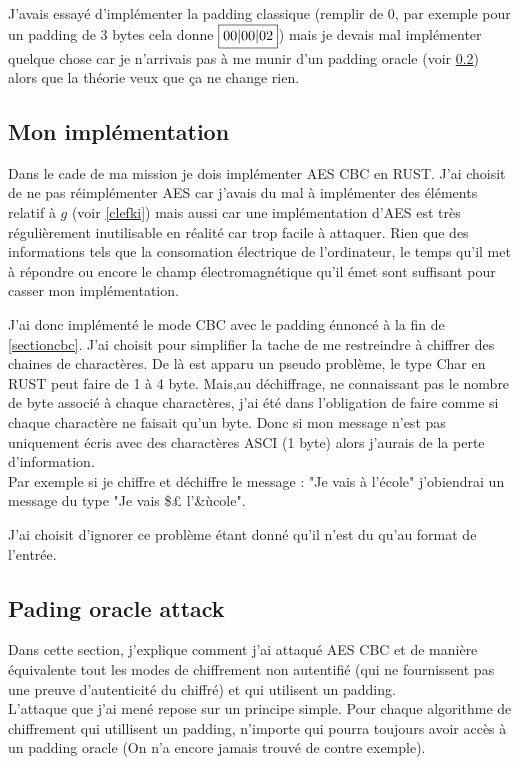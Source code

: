 \documentclass[a4paper, 12pt]{article}
\begin{document}
J'avais essayé d'implémenter la padding classique (remplir de $0$, par exemple pour un padding de 3 bytes cela donne $\fbox{00|00|02}$) mais je devais mal implémenter quelque chose car je n'arrivais pas à me munir d'un padding oracle (voir \ref{padoracle}) alors que la théorie veux que ça ne change rien.

\subsection{Mon implémentation}
Dans le cade de ma mission je dois implémenter AES CBC en RUST. 
J'ai choisit de ne pas réimplémenter AES car j'avais du mal à implémenter des éléments relatif à $g$ (voir \ref{clefki}) mais aussi car une implémentation d'AES est très régulièrement inutilisable en réalité car trop facile à attaquer. Rien que des informations tels que la consomation électrique de l'ordinateur, le temps qu'il met à répondre ou encore le champ électromagnétique qu'il émet sont suffisant pour casser mon implémentation. 

J'ai donc implémenté le mode CBC avec le padding énnoncé à la fin de \ref{sectioncbc}. J'ai choisit pour simplifier la tache de me restreindre à chiffrer des chaines de charactères. De là est apparu un pseudo problème, le type Char en RUST peut faire de 1 à 4 byte. Mais,au déchiffrage, ne connaissant pas le nombre de byte associé à chaque charactères, j'ai été dans l'obligation de faire comme si chaque charactère ne faisait qu'un byte. Donc si mon message n'est pas uniquement écris avec des charactères ASCI (1 byte) alors j'aurais de la perte d'information. \\
Par exemple si je chiffre et déchiffre le message : "Je vais à l'école" j'obiendrai un message du type "Je vais \$£ l'\&ùcole".

J'ai choisit d'ignorer ce problème étant donné qu'il n'est du qu'au format de l'entrée.

\subsection{Pading oracle attack}\label{padoracle}
Dans cette section, j'explique comment j'ai attaqué AES CBC et de manière équivalente tout les modes de chiffrement non autentifié (qui ne fournissent pas une preuve d'autenticité du chiffré) et qui utilisent un padding. \\ 

L'attaque que j'ai mené repose sur un principe simple. Pour chaque algorithme de chiffrement qui utillisent un padding, n'importe qui pourra toujours avoir accès à un padding oracle (On n'a encore jamais trouvé de contre exemple). 
\end{document}
